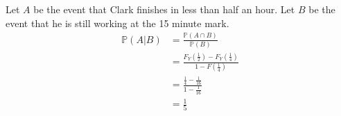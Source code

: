 \documentclass[12pt]{article}
\begin{document}
\newpage
{}
Let $A$ be the event that Clark finishes in less than half an hour. Let $B$ be the event that he is still working at the 15 minute mark.
\begin{align*}
    \mathbb P(A|B) &= \frac{\mathbb P(A \cap B)}{\mathbb P(B)} \\
                   &= \frac{F_Y({\frac12}) - F_Y({\frac14})}{1 - F({\frac14})} \\
                   &= \frac{\frac14 - \frac1{16}}{1 - \frac1{16}} \\
                   &= \frac15
\end{align*}
\end{document}
